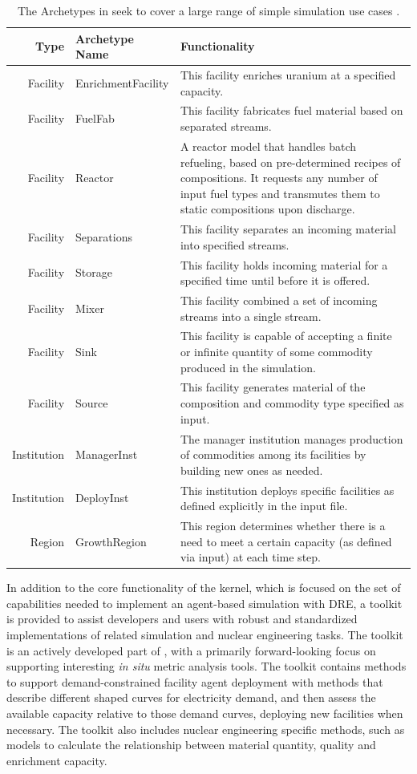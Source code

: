 \begin{table}[ht]
\centering
\caption{The Archetypes in \Cycamore seek to cover a large range of simple
simulation use cases \cite{carlsen_cycamore_2014}.}
\label{tab:cycamore}
\begin{tabularx}{\textwidth}{rlX}
\hline
\textbf{Type} & \textbf{Archetype Name} & \textbf{Functionality} \\
\hline
Facility & EnrichmentFacility & This facility enriches uranium at a specified capacity. \\
Facility & FuelFab & This facility fabricates fuel material based on separated streams. \\
Facility & Reactor & A reactor model that handles batch refueling, based on pre-determined recipes of compositions. It requests any number of input fuel types and transmutes them to static compositions upon discharge.\\
Facility & Separations & This facility separates an incoming material into specified streams. \\
Facility & Storage & This facility holds incoming material for a specified time until before it is offered. \\
Facility & Mixer & This facility combined a set of incoming streams into a single stream. \\
Facility & Sink & This facility is capable of accepting a finite or infinite quantity of some commodity produced in the simulation. \\
Facility & Source & This facility generates material of the composition and commodity type specified as input.  \\
Institution & ManagerInst & The manager institution manages production of commodities among its facilities by building new ones as needed. \\
Institution & DeployInst &  This institution deploys specific facilities as defined explicitly in the input file. \\
Region & GrowthRegion & This region determines whether there is a need to meet a certain capacity (as defined via input) at each time step. \\
\hline
\end{tabularx}
\end{table}

In addition to the core functionality of the \Cyclus kernel, which is focused
on the set of capabilities needed to implement an agent-based simulation with
\gls{DRE}, a toolkit is provided to assist developers and users with robust
and standardized implementations of related simulation and nuclear engineering
tasks. The toolkit is an actively developed part of \Cyclus, with a primarily
forward-looking focus on supporting interesting \textit{in situ} metric
analysis tools.  The toolkit contains methods to support demand-constrained
facility agent deployment with methods that describe different shaped curves
for electricity demand, and then assess the available capacity relative to
those demand curves, deploying new facilities when necessary.  The toolkit
also includes nuclear engineering specific methods, such as models to
calculate the relationship between material quantity, quality and enrichment
capacity.

